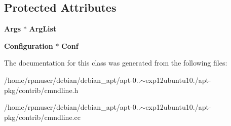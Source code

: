 \subsection*{\-Protected \-Attributes}
\begin{DoxyCompactItemize}
\item 
{\bf \-Args} $\ast$ {\bfseries \-Arg\-List}\label{classCommandLine_a6eac0dd981baa63b7ae17bcb4f4a94af}

\item 
{\bf \-Configuration} $\ast$ {\bfseries \-Conf}\label{classCommandLine_aafe4ebd997311e3d02ae67430910f03e}

\end{DoxyCompactItemize}


\-The documentation for this class was generated from the following files\-:\begin{DoxyCompactItemize}
\item 
/home/rpmuser/debian/debian\-\_\-apt/apt-\/0..$\sim$exp12ubuntu10./apt-\/pkg/contrib/cmndline.\-h\item 
/home/rpmuser/debian/debian\-\_\-apt/apt-\/0..$\sim$exp12ubuntu10./apt-\/pkg/contrib/cmndline.\-cc\end{DoxyCompactItemize}
